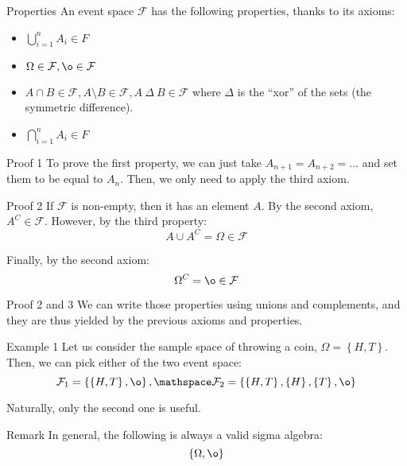 \documentclass[a4paper]{article}
\begin{document}
\begin{parag}{Properties}
    An event space $\mathcal{F}$ has the following properties, thanks to its axioms:
    \begin{itemize}
        \item $\displaystyle \bigcup_{i=1}^{n} A_i \in F$
        \item $\displaystyle \Omega \in \mathcal{F}, \o \in \mathcal{F}$
        \item $\displaystyle A \cap B \in \mathcal{F}, A \setminus B \in \mathcal{F}, A\ \Delta\ B \in \mathcal{F}$ where $\Delta$ is the ``xor'' of the sets (the symmetric difference).
        \item $\displaystyle \bigcap_{i=1}^{n} A_i \in F$
    \end{itemize}
    
    \begin{subparag}{Proof 1}
        To prove the first property, we can just take $A_{n+1} = A_{n+2} = \ldots$ and set them to be equal to $A_n$. Then, we only need to apply the third axiom.
    \end{subparag}

    \begin{subparag}{Proof 2}
        If $\mathcal{F}$ is non-empty, then it has an element $A$. By the second axiom, $A^C \in \mathcal{F}$. However, by the third property:
        \[A \cup A^C = \Omega \in \mathcal{F}\]

        Finally, by the second axiom: 
        \[\Omega^C = \o \in \mathcal{F}\]
    \end{subparag}

    \begin{subparag}{Proof 2 and 3}
        We can write those properties using unions and complements, and they are thus yielded by the previous axioms and properties.
    \end{subparag}
\end{parag}

\begin{parag}{Example 1}
    Let us consider the sample space of throwing a coin, $\Omega = \left\{H, T\right\}$. Then, we can pick either of the two event space: 
    \[\mathcal{F}_1 = \left\{\left\{H, T\right\}, \o\right\}, \mathspace \mathcal{F}_2 = \left\{\left\{H, T\right\}, \left\{H\right\}, \left\{T\right\}, \o\right\}\]
    
    Naturally, only the second one is useful.

    \begin{subparag}{Remark}
        In general, the following is always a valid sigma algebra: 
        \[\left\{\Omega, \o\right\}\]
        
    \end{subparag}
\end{parag}
\end{document}
